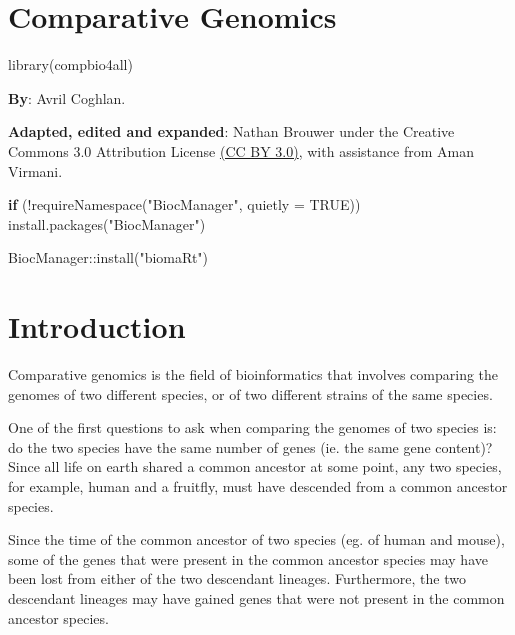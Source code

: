 \documentclass[
]{book}
\newenvironment{Shaded}{\begin{snugshade}}{\end{snugshade}}
\newcommand{\AttributeTok}[1]{\textcolor[rgb]{0.77,0.63,0.00}{#1}}
\newcommand{\ConstantTok}[1]{\textcolor[rgb]{0.00,0.00,0.00}{#1}}
\newcommand{\ControlFlowTok}[1]{\textcolor[rgb]{0.13,0.29,0.53}{\textbf{#1}}}
\newcommand{\FunctionTok}[1]{\textcolor[rgb]{0.00,0.00,0.00}{#1}}
\newcommand{\NormalTok}[1]{#1}
\newcommand{\SpecialCharTok}[1]{\textcolor[rgb]{0.00,0.00,0.00}{#1}}
\newcommand{\StringTok}[1]{\textcolor[rgb]{0.31,0.60,0.02}{#1}}
\begin{document}
\hypertarget{comparative-genomics}{%
\chapter{Comparative Genomics}\label{comparative-genomics}}

\begin{Shaded}
\begin{Highlighting}[]
\FunctionTok{library}\NormalTok{(compbio4all)}
\end{Highlighting}
\end{Shaded}

\textbf{By}: Avril Coghlan.

\textbf{Adapted, edited and expanded}: Nathan Brouwer under the Creative Commons 3.0 Attribution License \href{https://creativecommons.org/licenses/by/3.0/}{(CC BY 3.0)}, with assistance from Aman Virmani.

\begin{Shaded}
\begin{Highlighting}[]
\ControlFlowTok{if}\NormalTok{ (}\SpecialCharTok{!}\FunctionTok{requireNamespace}\NormalTok{(}\StringTok{"BiocManager"}\NormalTok{, }\AttributeTok{quietly =} \ConstantTok{TRUE}\NormalTok{))}
    \FunctionTok{install.packages}\NormalTok{(}\StringTok{"BiocManager"}\NormalTok{)}

\NormalTok{BiocManager}\SpecialCharTok{::}\FunctionTok{install}\NormalTok{(}\StringTok{"biomaRt"}\NormalTok{)}
\end{Highlighting}
\end{Shaded}

\hypertarget{introduction-1}{%
\chapter{Introduction}\label{introduction-1}}

Comparative genomics is the field of bioinformatics that involves comparing the genomes of two different species, or of two different strains of the same species.

One of the first questions to ask when comparing the genomes of two species is: do the two species have the same number of genes (ie. the same gene content)? Since all life on earth shared a common ancestor at some point, any two species, for example, human and a fruitfly, must have descended from a common ancestor species.

Since the time of the common ancestor of two species (eg. of human and mouse), some of the genes that were present in the common ancestor species may have been lost from either of the two descendant lineages. Furthermore, the two descendant lineages may have gained genes that were not present in the common ancestor species.
\end{document}
